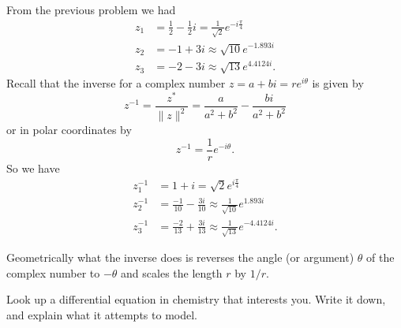 \documentclass[12pt]{article} %
\begin{document}
\begin{solution}
From the previous problem we had
\begin{align*}
z_1 &= \frac{1}{2}-\frac{1}{2}i = \frac{1}{\sqrt{2}}e^{-i\frac{\pi}{4}}\\
z_2 &= -1 + 3i \approx \sqrt{10}e^{-1.893i}\\
z_3 &= -2 - 3i \approx \sqrt{13}{e^{4.4124i}}.
\end{align*}
Recall that the inverse for a complex number $z=a+bi=re^{i\theta}$ is given by
\[
z^{-1}=\frac{z^*}{\|z\|^2}=\frac{a}{a^2+b^2}-\frac{bi}{a^2+b^2}
\]
or in polar coordinates by
\[
z^{-1}=\frac{1}{r}e^{-i\theta}.
\]
So we have
\begin{align*}
    z_1^{-1} &= 1+i = \sqrt{2}e^{i\frac{\pi}{4}}\\
    z_2^{-1} &= \frac{-1}{10}-\frac{3i}{10} \approx \frac{1}{\sqrt{10}} e^{1.893i}\\
    z_3^{-1} &= \frac{-2}{13}+\frac{3i}{13} \approx \frac{1}{\sqrt{13}} e^{-4.4124i}.
\end{align*}
    \begin{center}
        \end{center}
    Geometrically what the inverse does is reverses the angle (or argument) $\theta$ of the complex number to $-\theta$ and scales the length $r$ by $1/r$. 
\end{solution}

\newpage

\begin{problem}
    Look up a differential equation in chemistry that interests you.  Write it down, and explain what it attempts to model.
\end{problem}
\end{document}
